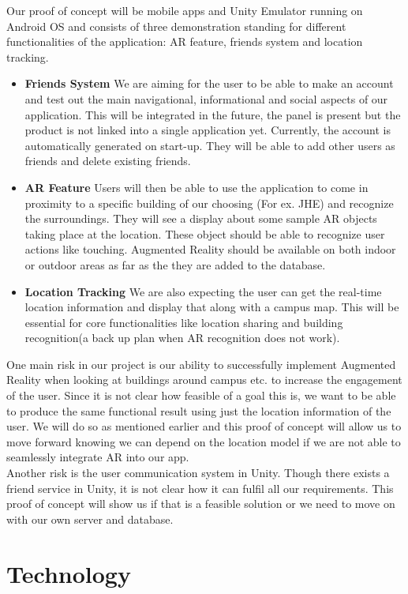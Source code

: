 \documentclass{article}
\begin{document}
Our proof of concept will be mobile apps and Unity Emulator running on Android OS and consists of three demonstration standing for different functionalities of the application: AR feature, friends system and location tracking. 
\begin{itemize}
	\item \textbf{Friends System} We are aiming for the user to be able to make an account and test out the main navigational, informational and social aspects of our application. This will be integrated in the future, the panel is present but the product is not linked into a single application yet. Currently, the account is automatically generated on start-up. They will be able to add other users as friends and delete existing friends. 
	\item \textbf{AR Feature} Users will then be able to use the application to come in proximity to a specific building of our choosing (For ex. JHE) and recognize the surroundings. They will see a display about some sample AR objects taking place at the location. These object should be able to recognize user actions like touching. Augmented Reality should be available on both indoor or outdoor areas as far as the they are added to the database.
	\item \textbf{Location Tracking} We are also expecting the user can get the real-time location information and display that along with a campus map. This will be essential for core functionalities like location sharing and building recognition(a back up plan when AR recognition does not work).
\end{itemize}
One main risk in our project is our ability to successfully implement Augmented Reality when looking at buildings around campus etc. to increase the engagement of the user. Since it is not clear how feasible of a goal this is, we want to be able to produce the same functional result using just the location information of the user. We will do so as mentioned earlier and this proof of concept will allow us to move forward knowing we can depend on the location model if we are not able to seamlessly integrate AR into our app.\\
Another risk is the user communication system in Unity. Though there exists a friend service in Unity, it is not clear how it can fulfil all our requirements. This proof of concept will show us if that is a feasible solution or we need to move on with our own server and database.

\section{Technology}
\end{document}
